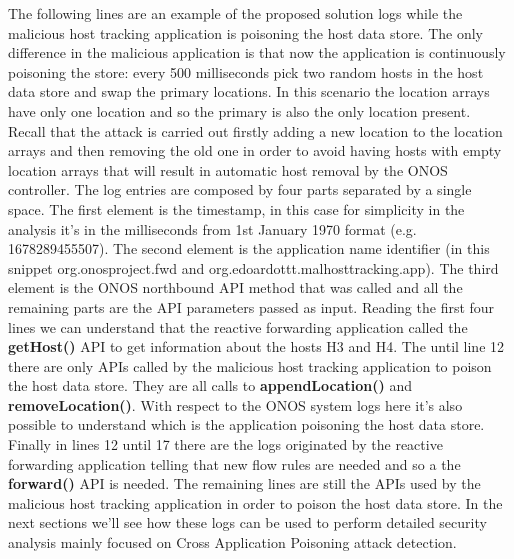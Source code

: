 \documentclass[a4paper,10pt]{memoir}
\begin{document}
The following lines are an example of the proposed solution logs while the malicious host tracking application is poisoning the host data store. The only difference in the malicious application is that now the application is continuously poisoning the store: every 500 milliseconds pick two random hosts in the host data store and swap the primary locations. In this scenario the location arrays have only one location and so the primary is also the only location present. Recall that the attack is carried out firstly adding a new location to the location arrays and then removing the old one in order to avoid having hosts with empty location arrays that will result in automatic host removal by the ONOS controller. The log entries are composed by four parts separated by a single space. The first element is the timestamp, in this case for simplicity in the analysis it's in the milliseconds from 1st January 1970 format (e.g. 1678289455507). The second element is the application name identifier (in this snippet org.onosproject.fwd and org.edoardottt.malhosttracking.app). The third element is the ONOS northbound API method that was called and all the remaining parts are the API parameters passed as input. Reading the first four lines we can understand that the reactive forwarding application called the \textbf{getHost()} API to get information about the hosts H3 and H4. The until line 12 there are only APIs called by the malicious host tracking application to poison the host data store. They are all calls to \textbf{appendLocation()} and \textbf{removeLocation()}. With respect to the ONOS system logs here it's also possible to understand which is the application poisoning the host data store. Finally in lines 12 until 17 there are the logs originated by the reactive forwarding application telling that new flow rules are needed and so a the \textbf{forward()} API is needed. The remaining lines are still the APIs used by the malicious host tracking application in order to poison the host data store. In the next sections we'll see how these logs can be used to perform detailed security analysis mainly focused on Cross Application Poisoning attack detection.
\end{document}
